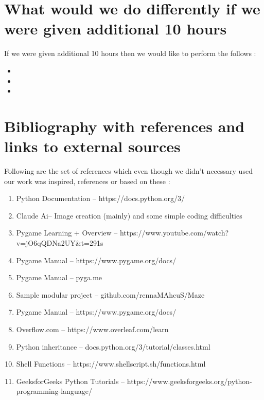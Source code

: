 \documentclass{article}
\begin{document}
\section*{What would we do differently if we were given additional 10 hours  }
If we were given additional 10 hours then we would like to perform the follows :
\begin{itemize}
    \item {}
    \item {}
    \item {}
\end{itemize}

\section*{Bibliography with references and links to external sources }
Following are the set of references which even though we didn't necessary used our work was inspired, references or based on these :

\begin{enumerate}
    \item Python Documentation -- https://docs.python.org/3/
    \item Claude Ai-- Image creation (mainly) and some simple coding difficulties 
    \item Pygame Learning + Overview -- https://www.youtube.com/watch?v=jO6qQDNa2UY&t=291s
    \item Pygame Manual -- https://www.pygame.org/docs/
    \item Pygame Manual --  pyga.me
    \item Sample modular project -- github.com/rennaMAhcuS/Maze
    \item Pygame Manual -- https://www.pygame.org/docs/
    \item Overflow.com -- https://www.overleaf.com/learn
    \item  Python inheritance -- docs.python.org/3/tutorial/classes.html
    \item Shell Functions -- https://www.shellscript.sh/functions.html
    \item GeeksforGeeks Python Tutorials -- https://www.geeksforgeeks.org/python-programming-language/
\end{enumerate}
\newpage
\end{document}
